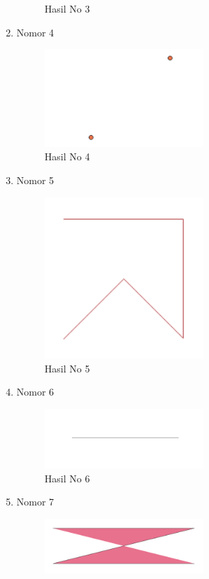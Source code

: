\begin{enumerate}
\begin{figure}[H]
		\centering
		\caption{Hasil No 3}
	\end{figure}
	\item Nomor 4
	
	\begin{figure}[H]
		\includegraphics[width=6cm]{figures/1174057/alit4.PNG}
		\centering
		\caption{Hasil No 4}
	\end{figure}
	\item Nomor 5
	
	\begin{figure}[H]
		\includegraphics[width=6cm]{figures/1174057/alit5.PNG}
		\centering
		\caption{Hasil No 5}
	\end{figure}
	\item Nomor 6
	
	\begin{figure}[H]
		\includegraphics[width=6cm]{figures/1174057/alit6.PNG}
		\centering
		\caption{Hasil No 6}
	\end{figure}
	\item Nomor 7
	
	\begin{figure}[H]
		\includegraphics[width=6cm]{figures/1174057/alit7.PNG}

\end{figure}
\end{enumerate}
